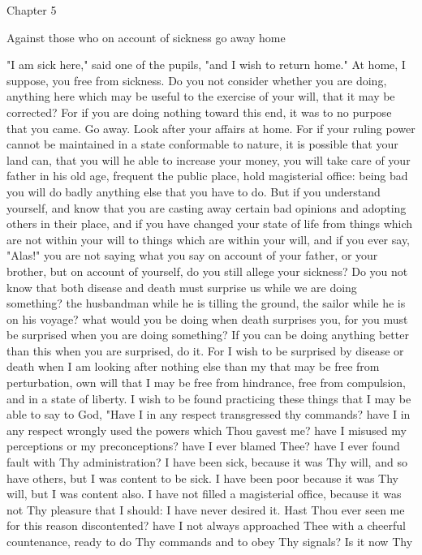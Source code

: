 \documentclass[a4paper]{article}
\begin{document}
Chapter 5

Against those who on account of sickness go away home

    "I am sick here," said one of the pupils, "and I wish to return home." At
home, I suppose, you free from sickness. Do you not consider whether you are
doing, anything here which may be useful to the exercise of your will, that it
may be corrected? For if you are doing nothing toward this end, it was to no
purpose that you came. Go away. Look after your affairs at home. For if your
ruling power cannot be maintained in a state conformable to nature, it is
possible that your land can, that you will he able to increase your money, you
will take care of your father in his old age, frequent the public place, hold
magisterial office: being bad you will do badly anything else that you have to
do. But if you understand yourself, and know that you are casting away certain
bad opinions and adopting others in their place, and if you have changed your
state of life from things which are not within your will to things which are
within your will, and if you ever say, "Alas!" you are not saying what you say
on account of your father, or your brother, but on account of yourself, do you
still allege your sickness? Do you not know that both disease and death must
surprise us while we are doing something? the husbandman while he is tilling
the ground, the sailor while he is on his voyage? what would you be doing when
death surprises you, for you must be surprised when you are doing something? If
you can be doing anything better than this when you are surprised, do it. For I
wish to be surprised by disease or death when I am looking after nothing else
than my that may be free from perturbation, own will that I may be free from
hindrance, free from compulsion, and in a state of liberty. I wish to be found
practicing these things that I may be able to say to God, "Have I in any
respect transgressed thy commands? have I in any respect wrongly used the
powers which Thou gavest me? have I misused my perceptions or my
preconceptions? have I ever blamed Thee? have I ever found fault with Thy
administration? I have been sick, because it was Thy will, and so have others,
but I was content to be sick. I have been poor because it was Thy will, but I
was content also. I have not filled a magisterial office, because it was not
Thy pleasure that I should: I have never desired it. Hast Thou ever seen me for
this reason discontented? have I not always approached Thee with a cheerful
countenance, ready to do Thy commands and to obey Thy signals? Is it now Thy
\end{document}
